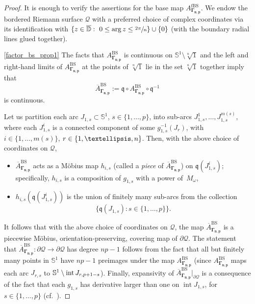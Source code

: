 \documentclass[10pt,a4paper]{amsart}
\newcommand{\cf}{cf.\ }
\theoremstyle{definition}
\theoremstyle{remark}
\newcommand{\D}{\mathbb{D}}
\DeclareMathOperator{\Int}{int}
\begin{document}
\begin{proof}
It is enough to verify the assertions for the base map $A_{\pmb{\Gamma_{n,p}}}^{\mathrm{fBS}}$.
We endow the bordered Riemann surface $\mathcal{\mathcal{Q}}$ with a preferred choice of complex coordinates via its identification with $\{z\in\overline{\D}:\ 0\leq\arg{z}\leq\sfrac{2\pi}{n}\}\cup\{0\}$ (with the boundary radial lines glued together).

\eqref{factor_bs_prop1} The facts that $A_{\pmb{\Gamma_{n,p}}}^{\mathrm{BS}}$ is continuous on $\mathbb{S}^1\setminus\sqrt[n]{1}$ and the left and right-hand limits of $A_{\pmb{\Gamma_{n,p}}}^{\mathrm{BS}}$ at the points of $\sqrt[n]{1}$ lie in the set $\sqrt[n]{1}$ together imply that
\[
\overline{A}_{\pmb{\Gamma_{n,p}}}^{\mathrm{BS}}:=\mathfrak{q}\circ A_{\pmb{\Gamma_{n,p}}}^{\mathrm{BS}}\circ\mathfrak{q}^{-1}
\]
is continuous.

Let us partition each arc $J_{1,s}\subset\mathbb{S}^1$, $s\in\{1,\dots,p\}$, into sub-arcs $J_{1,s}^1,\dots, J_{1,s}^{m(s)}$, where each $J_{1,s}^i$ is a connected component of some $g_{1,s}^{-1}(J_r)$, with $i\in\{1,\dots,m(s)\}$, $r\in\nobreak\{1,\dots,n\}$. Then, with the above choice of coordinates on $\mathcal{Q}$,
\begin{itemize}
\item $\overline{A}_{\pmb{\Gamma_{n,p}}}^{\mathrm{BS}}$ acts as a Möbius map $h_{i,s}$ (called a \emph{piece} of $\overline{A}_{\pmb{\Gamma_{n,p}}}^{\mathrm{BS}}$) on $\mathfrak{q}(J_{1,s}^i)$; specifically, $h_{i,s}$ is a composition of $g_{1,s}$ with a power of~$M_\omega$,

\item $h_{i,s}(\mathfrak{q}(J_{1,s}^i))$ is the union of finitely many sub-arcs from the collection
\[
\{\mathfrak{q}(J_{1,s}):s\in\{1,\dots,p\}\}.
\]
\end{itemize}
It follows that with the above choice of coordinates on $\mathcal{Q}$, the map $\overline{A}_{\pmb{\Gamma_{n,p}}}^{\mathrm{BS}}$ is a piecewise Möbius, orientation-preserving, covering map of $\partial\mathcal{Q}$. The statement that $\overline{A}_{\pmb{\Gamma_{n,p}}}^{\mathrm{BS}}:\partial\mathcal{Q}\to\partial\mathcal{Q}$ has degree $np-1$ follows from the fact that all but finitely many points in $\mathbb{S}^1$ have $np-1$ preimages under the map $A_{\pmb{\Gamma_{n,p}}}^{\mathrm{BS}}$ (since $A_{\pmb{\Gamma_{n,p}}}^{\mathrm{BS}}$ maps each arc $J_{r,s}$ to $\mathbb{S}^1\setminus\nobreak\Int{J_{r,p+1-s}}$). Finally, expansivity of $\overline{A}_{\pmb{\Gamma_{n,p}}}^{\mathrm{BS}}\vert_{\partial\mathcal{Q}}$ is a consequence of the fact that each $g_{1,s}$ has derivative larger than one on $\Int{J_{1,s}}$, for $s\in\{1,\dots,p\}$ (\cf \cite[Lem.\,3.8]{LMMN}).


\end{proof}
\end{document}
